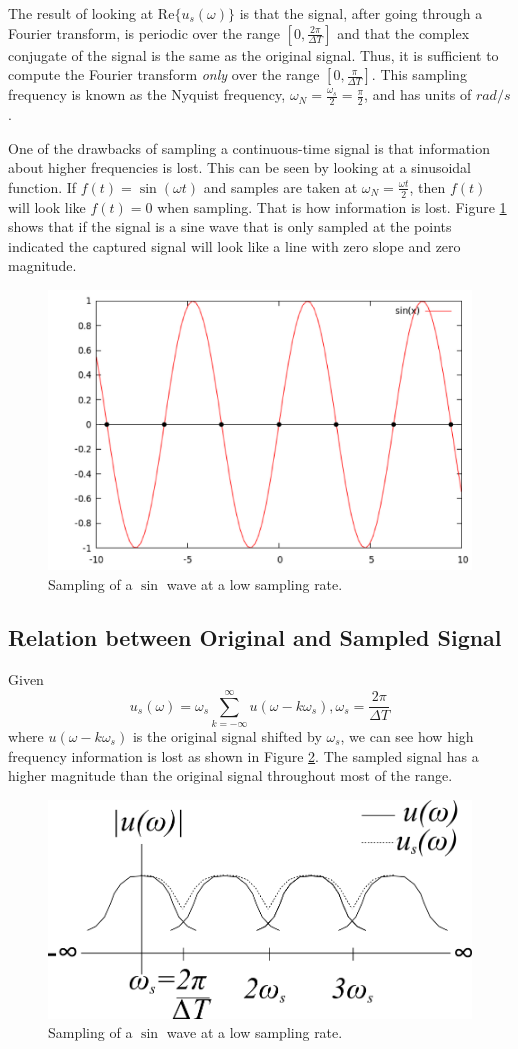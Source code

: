 \documentclass[lecture,12pt,]{pcms-l}
\theoremstyle{example}
\newcommand{\w}{\omega}
\begin{document}
The result of looking at $\text{Re}\{u_s(\w)\}$ is that the signal, after going through a Fourier transform, is periodic over the range $[0, \frac{2\pi}{\Delta T}]$ and that the complex conjugate of the signal is the same as the original signal. Thus, it is sufficient to compute the Fourier transform \textit{only} over the range $[0, \frac{\pi}{\Delta T}]$. This sampling frequency is known as the Nyquist frequency, $\w_N = \frac{\w_s}{2} = \frac{\pi}{2}$, and has units of $rad/s$.

One of the drawbacks of sampling a continuous-time signal is that information about higher frequencies is lost. This can be seen by looking at a sinusoidal function. If $f(t) = \sin(\w t)$ and samples are taken at $\w_N = \frac{\w t}{2}$, then $f(t)$ will look like $f(t) = 0$ when sampling. That is how information is lost. Figure \ref{fig:02lowSampleRate} shows that if the signal is a sine wave that is only sampled at the points indicated the captured signal will look like a line with zero slope and zero magnitude.
\begin{figure}[ht!]
	\centering
	\includegraphics[width=.5\textwidth]{images/02lowSampleRate}
	\caption{Sampling of a $\sin$ wave at a low sampling rate.}
	\label{fig:02lowSampleRate}
\end{figure}

\subsection{Relation between Original and Sampled Signal}
Given
$$u_s(\w) = \w_s \sum_{k=-\infty}^\infty u(\w-k\w_s), \w_s = \frac{2\pi}{\Delta T}$$
where $u(\w-k\w_s)$ is the original signal shifted by $\w_s$, we can see how high frequency information is lost as shown in Figure \ref{fig:02freqResp}. The sampled signal has a higher magnitude than the original signal throughout most of the range.
\begin{figure}[ht!]
	\centering
	\includegraphics[width=.56\textwidth]{images/02freqResp}
	\caption{Sampling of a $\sin$ wave at a low sampling rate.}
	\label{fig:02freqResp}
\end{figure}
\end{document}
